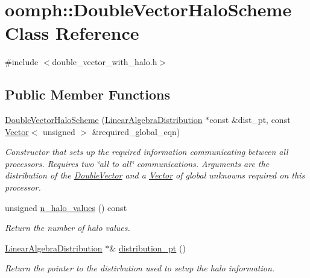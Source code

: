\hypertarget{classoomph_1_1DoubleVectorHaloScheme}{}\section{oomph\+:\+:Double\+Vector\+Halo\+Scheme Class Reference}
\label{classoomph_1_1DoubleVectorHaloScheme}


{\ttfamily \#include $<$double\+\_\+vector\+\_\+with\+\_\+halo.\+h$>$}

\subsection*{Public Member Functions}
\begin{DoxyCompactItemize}
\item 
\hyperlink{classoomph_1_1DoubleVectorHaloScheme_ac3809f5cac00b082a66bbf706087627e}{Double\+Vector\+Halo\+Scheme} (\hyperlink{classoomph_1_1LinearAlgebraDistribution}{Linear\+Algebra\+Distribution} $\ast$const \&dist\+\_\+pt, const \hyperlink{classoomph_1_1Vector}{Vector}$<$ unsigned $>$ \&required\+\_\+global\+\_\+eqn)
\begin{DoxyCompactList}\small\item\em Constructor that sets up the required information communicating between all processors. Requires two \char`\"{}all to all\char`\"{} communications. Arguments are the distribution of the \hyperlink{classoomph_1_1DoubleVector}{Double\+Vector} and a \hyperlink{classoomph_1_1Vector}{Vector} of global unknowns required on this processor. \end{DoxyCompactList}\item 
unsigned \hyperlink{classoomph_1_1DoubleVectorHaloScheme_a490138b2ae077bc6630d13057217105b}{n\+\_\+halo\+\_\+values} () const
\begin{DoxyCompactList}\small\item\em Return the number of halo values. \end{DoxyCompactList}\item 
\hyperlink{classoomph_1_1LinearAlgebraDistribution}{Linear\+Algebra\+Distribution} $\ast$\& \hyperlink{classoomph_1_1DoubleVectorHaloScheme_a269dd2eab9a60bfc4c6cf80a2689f6d6}{distribution\+\_\+pt} ()
\begin{DoxyCompactList}\small\item\em Return the pointer to the distirbution used to setup the halo information. \end{DoxyCompactList}\item 

\end{DoxyCompactItemize}
